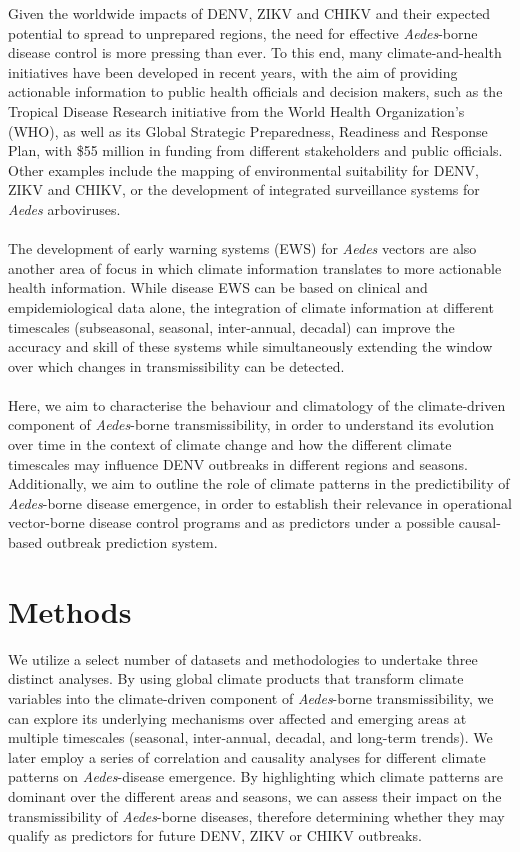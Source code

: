 \documentclass[10pt,twocolumn]{wlscirep}
\begin{document}
Given the worldwide impacts of DENV, ZIKV and CHIKV and their expected potential to spread to unprepared regions, the need for effective \textit{Aedes}-borne disease control is more pressing than ever. To this end, many climate-and-health initiatives have been developed in recent years, with the aim of providing actionable information to public health officials and decision makers, such as the Tropical Disease Research initiative from the World Health Organization's (WHO)\cite{keating_2023, ramirez_2017}, as well as its Global Strategic Preparedness, Readiness and Response Plan, with \$55 million in funding from different stakeholders and public officials. Other examples include the mapping of environmental suitability for DENV, ZIKV and CHIKV\cite{munoz_2020a, guerra_2025}, or the development of integrated surveillance systems for \textit{Aedes} arboviruses\cite{leandro_2024}.
\\
\\
The development of early warning systems (EWS) for \textit{Aedes} vectors are also another area of focus in which climate information translates to more actionable health information\cite{ropelewski_1985}. While disease EWS can be based on clinical and empidemiological data alone, the integration of climate information at different timescales (subseasonal, seasonal, inter-annual, decadal) can improve the accuracy and skill of these systems while simultaneously extending the window over which changes in transmissibility can be detected\cite{thomson_2006, cox_2007}.
\\
\\
Here, we aim to characterise the behaviour and climatology of the climate-driven component of \textit{Aedes}-borne transmissibility, in order to understand its evolution over time in the context of climate change and how the different climate timescales may influence DENV outbreaks in different regions and seasons. Additionally, we aim to outline the role of climate patterns in the predictibility of \textit{Aedes}-borne disease emergence, in order to establish their relevance in operational vector-borne disease control programs and as predictors under a possible causal-based outbreak prediction system.

\section{Methods} \label{sec-methods}

We utilize a select number of datasets and methodologies to undertake three distinct analyses. By using global climate products that transform climate variables into the climate-driven component of \textit{Aedes}-borne transmissibility, we can explore its underlying mechanisms over affected and emerging areas at multiple timescales (seasonal, inter-annual, decadal, and long-term trends). We later employ a series of correlation and causality analyses for different climate patterns on \textit{Aedes}-disease emergence. By highlighting which climate patterns are dominant over the different areas and seasons, we can assess their impact on the transmissibility of \textit{Aedes}-borne diseases, therefore determining whether they may qualify as predictors for future DENV, ZIKV or CHIKV outbreaks.
\end{document}
